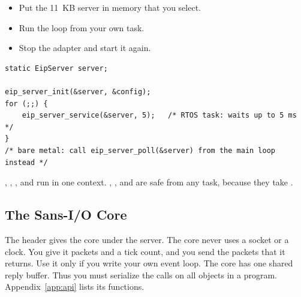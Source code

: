 \begin{itemize}
  \item Put the 11~KB server in memory that you select.
  \item Run the loop from your own task.
  \item Stop the adapter and start it again.
\end{itemize}

\begin{lstlisting}
static EipServer server;

eip_server_init(&server, &config);
for (;;) {
    eip_server_service(&server, 5);   /* RTOS task: waits up to 5 ms */
}
/* bare metal: call eip_server_poll(&server) from the main loop instead */
\end{lstlisting}

, , ,
and  run in one context. ,
, and  are safe from any
task, because they take .

\subsection{The Sans-I/O Core}

The header  gives the core under the server. The core
never uses a socket or a clock. You give it packets and a tick count, and you
send the packets that it returns. Use it only if you write your own event
loop. The core has one shared reply buffer. Thus you must serialize the calls
on all  objects in a program. Appendix~\ref{app:api} lists
its functions.
